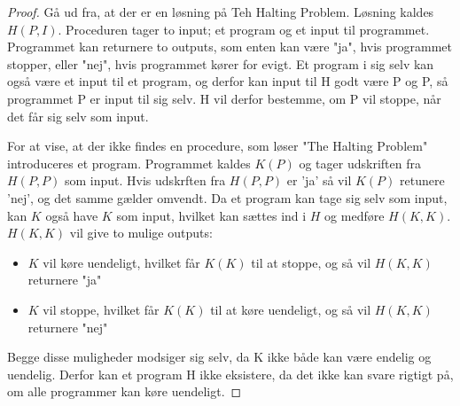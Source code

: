 \begin{proof}
Gå ud fra, at der er en løsning på Teh Halting Problem. Løsning kaldes $H(P, I)$. Proceduren tager to input; et program og et input til programmet. Programmet kan returnere to outputs, som enten kan være "ja", hvis programmet stopper, eller "nej", hvis programmet kører for evigt. 
Et program i sig selv kan også være et input til et program, og derfor kan input til H godt være P og P, så programmet P er input til sig selv.
H vil derfor bestemme, om P vil stoppe, når det får sig selv som input.

For at vise, at der ikke findes en procedure, som løser "The Halting Problem" introduceres et program. 
Programmet kaldes $K(P)$ og tager udskriften fra $H(P,P)$ som input.
Hvis udskrften fra $H(P,P)$ er 'ja' så vil $K(P)$ retunere 'nej', og det samme gælder omvendt.  
Da et program kan tage sig selv som input, kan $K$ også have $K$ som input, hvilket kan sættes ind i $H$ og  medføre $H(K,K)$. 
$H(K, K)$ vil give to mulige outputs:
\begin{itemize}
	\item $K$ vil køre uendeligt, hvilket får $K(K)$ til at stoppe, og så vil $H(K,K)$ returnere "ja"
	\item  $K$ vil stoppe, hvilket får $K(K)$ til at køre uendeligt, og så vil $H(K,K)$ returnere "nej"
\end{itemize}
Begge disse muligheder modsiger sig selv, da K ikke både kan være endelig og uendelig. Derfor kan et program H ikke eksistere, da det ikke kan svare rigtigt på, om alle programmer kan køre uendeligt. 

\end{proof}
